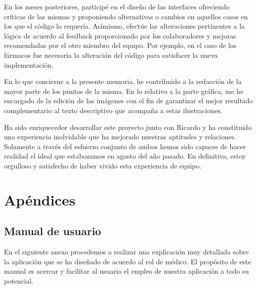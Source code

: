 \documentclass[11pt,spanish,
		listoftables,listoffigures]
		{tfgplantilla}
\begin{document}
En los meses posteriores, participé en el diseño de las interfaces ofreciendo críticas de las mismas y proponiendo alternativas o cambios en aquellos casos en los que el código lo requería. Asímismo, efectúe las alteraciones pertinentes a la lógica de acuerdo al feedback proporcionado por los colaboradores y mejoras recomendadas por el otro miembro del equipo. Por ejemplo, en el caso de los fármacos fue necesaria la alteración del código para satisfacer la nueva implementación.

En lo que concierne a la presente memoria, he contribuido a la redacción de la mayor parte de los puntos de la misma. En lo relativo a la parte gráfica, me he encargado de la edición de las imágenes con el fin de garantizar el mejor resultado complementario al texto descriptivo que acompaña a estas ilustraciones.

Ha sido enriquecedor desarrollar este proyecto junto con Ricardo y ha constituido una experiencia inolvidable que ha mejorado nuestras aptitudes y relaciones. Solamente a través del esfuerzo conjunto de ambos hemos sido capaces de hacer realidad el ideal que estabozamos en agosto del año pasado. En definitiva, estoy orgulloso y satisfecho de haber vivido esta experiencia de equipo.

\cleardoublepage


\chapter{Apéndices}


\section{Manual de usuario}

En el siguiente anexo procedemos a realizar una explicación muy detallada sobre la aplicación que se ha diseñado de acuerdo al rol de médico. El propósito de este manual es  acercar y facilitar al usuario el empleo de nuestra aplicación a todo su potencial. 
\end{document}
